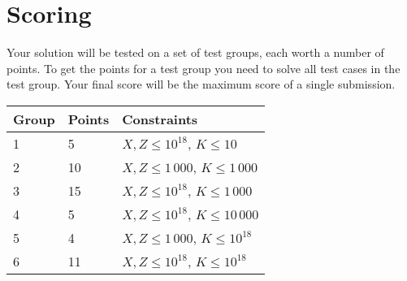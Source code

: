 \section*{Scoring}
Your solution will be tested on a set of test groups, each worth a number of points.
To get the points for a test group you need to solve all test cases in the test group.
Your final score will be the maximum score of a single submission.

\noindent
\begin{tabular}{| l | l | l |}
\hline
Group & Points & Constraints \\ \hline
1     & 5      & $X, Z \le 10^{18}$, $K \le 10$ \\ \hline
2     & 10      & $X, Z \le 1\,000$, $K \le 1\,000$ \\ \hline
3     & 15      & $X, Z \le 10^{18}$, $K \le 1\,000$ \\ \hline
4     & 5      & $X, Z \le 10^{18}$, $K \le 10\,000$ \\ \hline
5     & 4     & $X, Z \le 1\,000$, $K \le 10^{18}$ \\ \hline
6     & 11     & $X, Z \le 10^{18}$, $K \le 10^{18}$ \\ \hline
\end{tabular}
